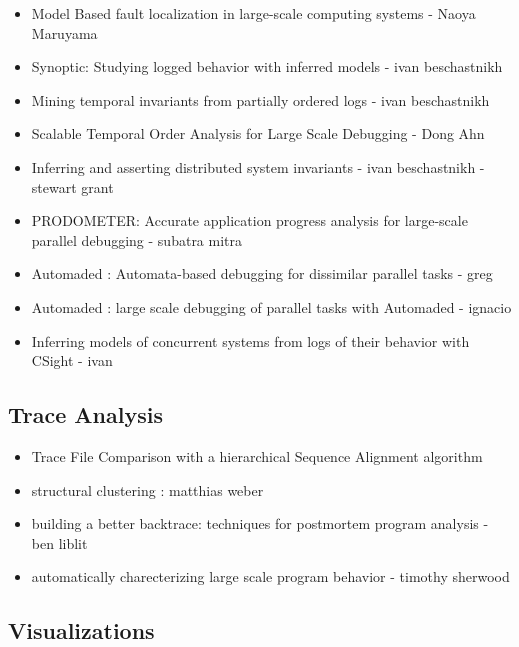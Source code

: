 \begin{itemize}
\item Model Based fault localization in large-scale computing systems - Naoya Maruyama \cite{satoshi-08}
\item Synoptic: Studying logged behavior with inferred models - ivan beschastnikh \cite{beschastnikh-synoptic}
\item Mining temporal invariants from partially ordered logs -  ivan beschastnikh \cite{beschastnikh-pologs}
\item Scalable Temporal Order Analysis for Large Scale Debugging - Dong Ahn \cite{Ahn:2009}
\item Inferring and asserting distributed system invariants -  ivan beschastnikh - stewart grant \cite{grant18}
\item PRODOMETER: Accurate application progress analysis for large-scale parallel debugging - subatra mitra \cite{prodometer}
\item Automaded : Automata-based debugging for dissimilar parallel tasks - greg \cite{automaded-GBron}
\item Automaded : large scale debugging of parallel tasks with Automaded - ignacio \cite{automaded-laguna}

\item Inferring models of concurrent systems from logs of their behavior with CSight - ivan \cite{beschastnikh-csight}
\end{itemize}




\subsection{Trace Analysis}


\begin{itemize}
\item Trace File Comparison with a hierarchical Sequence Alignment algorithm \cite{weber-seqAlign}
\item structural clustering : matthias weber \cite{weberStructural}
\item building a better backtrace: techniques for postmortem program analysis - ben liblit \cite{liblit02}
\item automatically charecterizing large scale program behavior - timothy sherwood \cite{sherwood02}
\end{itemize}


\subsection{Visualizations}


